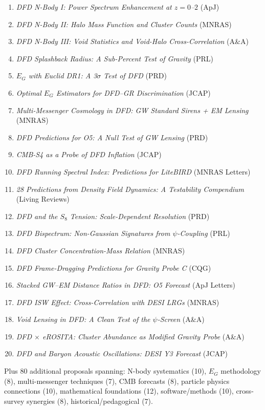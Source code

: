 \documentclass[11pt,a4paper]{article}
\begin{document}
\begin{enumerate}[nosep]
\item \textit{DFD N-Body I: Power Spectrum Enhancement at $z = 0$--$2$} (ApJ)
\item \textit{DFD N-Body II: Halo Mass Function and Cluster Counts} (MNRAS)
\item \textit{DFD N-Body III: Void Statistics and Void-Halo Cross-Correlation} (A\&A)
\item \textit{DFD Splashback Radius: A Sub-Percent Test of Gravity} (PRL)
\item \textit{$E_G$ with Euclid DR1: A 3$\sigma$ Test of DFD} (PRD)
\item \textit{Optimal $E_G$ Estimators for DFD--GR Discrimination} (JCAP)
\item \textit{Multi-Messenger Cosmology in DFD: GW Standard Sirens + EM Lensing} (MNRAS)
\item \textit{DFD Predictions for O5: A Null Test of GW Lensing} (PRD)
\item \textit{CMB-S4 as a Probe of DFD Inflation} (JCAP)
\item \textit{DFD Running Spectral Index: Predictions for LiteBIRD} (MNRAS Letters)
\item \textit{28 Predictions from Density Field Dynamics: A Testability Compendium} (Living Reviews)
\item \textit{DFD and the $S_8$ Tension: Scale-Dependent Resolution} (PRD)
\item \textit{DFD Bispectrum: Non-Gaussian Signatures from $\psi$-Coupling} (PRL)
\item \textit{DFD Cluster Concentration-Mass Relation} (MNRAS)
\item \textit{DFD Frame-Dragging Predictions for Gravity Probe C} (CQG)
\item \textit{Stacked GW--EM Distance Ratios in DFD: O5 Forecast} (ApJ Letters)
\item \textit{DFD ISW Effect: Cross-Correlation with DESI LRGs} (MNRAS)
\item \textit{Void Lensing in DFD: A Clean Test of the $\psi$-Screen} (A\&A)
\item \textit{DFD $\times$ eROSITA: Cluster Abundance as Modified Gravity Probe} (A\&A)
\item \textit{DFD and Baryon Acoustic Oscillations: DESI Y3 Forecast} (JCAP)
\end{enumerate}

Plus 80 additional proposals spanning: N-body systematics (10), $E_G$ methodology (8), multi-messenger techniques (7), CMB forecasts (8), particle physics connections (10), mathematical foundations (12), software/methods (10), cross-survey synergies (8), historical/pedagogical (7).
\end{document}
